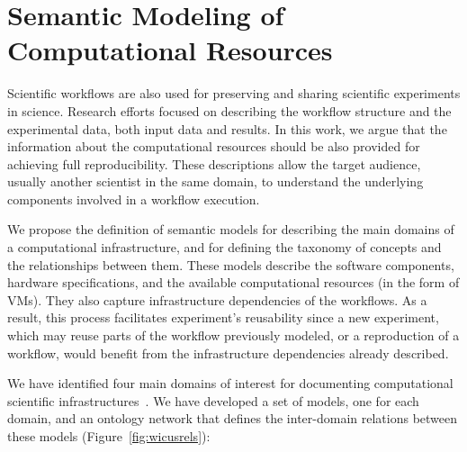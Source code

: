 \section{Semantic Modeling of Computational Resources}
\label{sec:semantic}

Scientific workflows are also used for preserving and sharing scientific experiments 
in science. Research efforts focused on describing the workflow structure and the 
experimental data, both input data and results. In this work, we argue that the information 
about the computational resources should be also provided for achieving full reproducibility. 
These descriptions allow the target audience, usually another scientist in the same domain, 
to understand the underlying components involved in a workflow execution.

We propose the definition of semantic models for describing the main domains of a 
computational infrastructure, and for defining the taxonomy of concepts and the relationships 
between them. These models describe the software components, hardware specifications, 
and the available computational resources (in the form of VMs). They also capture infrastructure 
dependencies of the workflows. As a result, this process facilitates experiment's reusability since 
a new experiment, which may reuse parts of the workflow previously modeled, or a reproduction 
of a workflow, would benefit from the infrastructure dependencies already described.

We have identified four main domains of interest for documenting computational scientific 
infrastructures~\cite{wicus}. We have developed a set of models, one for each domain, 
and an ontology network that defines the inter-domain relations between these models 
(Figure~\ref{fig:wicusrels}):

